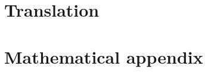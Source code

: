 


{}
 
 \ssp			%
 \newpage
 
 \newpage
 
 \newpage
 
 \newpage
 

\tableofcontents
%
\listoffigures{}
\dsp			%
% 
% 
% 
% 
\newpage			%








% 
 \newpage
% 
 



 \appendix
 \chapter{Translation} %
 
 \chapter{Mathematical appendix}
 
 
 
% 
% 







